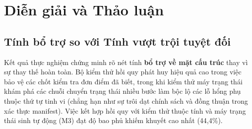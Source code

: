 \documentclass[11pt]{article}
\begin{document}
\section{Diễn giải và Thảo luận}
\subsection{Tính bổ trợ so với Tính vượt trội tuyệt đối}
Kết quả thực nghiệm chứng minh rõ nét tính \textbf{bổ trợ về mặt cấu trúc} thay vì sự thay thế hoàn toàn. Bộ kiểm thử hồi quy phát huy hiệu quả cao trong việc bảo vệ các chốt kiểm tra đơn điểm đã biết, trong khi kiểm thử máy trạng thái khám phá các chuỗi chuyển trạng thái nhiều bước làm bộc lộ các lỗ hổng phụ thuộc thứ tự tinh vi (chẳng hạn như sự trôi dạt chính sách và đồng thuận trong xác thực manifest). Việc kết hợp hồi quy với kiểm thử thuộc tính và máy trạng thái sinh tự động (M3) đạt độ bao phủ khiếm khuyết cao nhất (44,4\%).
\end{document}
